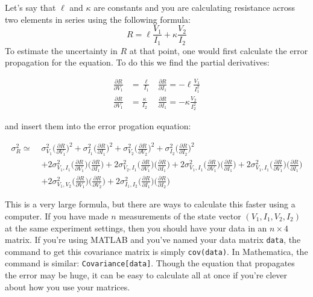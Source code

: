 \begin{example}
Let's say that $\ell$ and $\kappa$ are constants and you are calculating resistance across two elements in series using the following formula:
\begin{equation}
R = \ell \frac{V_1}{I_1} + \kappa \frac{V_2}{I_2}
\end{equation}
To estimate the uncertainty in $R$ at that point, one would first calculate the error propagation for the equation. To do this we find the partial derivatives:

\begin{align*}
	\frac{\partial R}{\partial V_1} &= \frac{\ell}{I_1} 		&	\frac{\partial R}{\partial I_1} = -\ell \frac{V_1}{I_1^2} 	\\
  	\frac{\partial R}{\partial V_1} &= \frac{\kappa}{I_2}  	&	\frac{\partial R}{\partial I_1} = -\kappa \frac{V_2}{I_2^2}
\end{align*}

and insert them into the error progation equation:

\begin{align*}
\sigma_R^2 \simeq   \; & \sigma_{V_1}^2 \bigg ( \frac{\partial R}{\partial V_1}\bigg )^2 + \sigma_{I_1}^2 \bigg ( \frac{\partial R}{\partial I_1}\bigg )^2  + \sigma_{V_2}^2 \bigg ( \frac{\partial R}{\partial V_2}\bigg )^2 + \sigma_{I_2}^2 \bigg ( \frac{\partial R}{\partial I_2}\bigg )^2   \\ &+ 2\sigma_{V_1,I_1}^2\bigg ( \frac{\partial R}{\partial V_1}\bigg )  \bigg ( \frac{\partial R}{\partial I_1}\bigg )  + 2\sigma_{V_2,I_1}^2\bigg ( \frac{\partial R}{\partial V_1}\bigg )  \bigg ( \frac{\partial R}{\partial I_1}\bigg ) + 2\sigma_{V_1,I_1}^2\bigg ( \frac{\partial R}{\partial V_1}\bigg )  \bigg ( \frac{\partial R}{\partial I_1}\bigg ) + 2\sigma_{V_1,I_1}^2\bigg ( \frac{\partial R}{\partial V_1}\bigg )  \bigg ( \frac{\partial R}{\partial I_1}\bigg ) \\ &  + 2\sigma_{V_1,V_2}^2\bigg ( \frac{\partial R}{\partial V_1}\bigg )  \bigg ( \frac{\partial R}{\partial V_2}\bigg )  + 2\sigma_{I_1,I_2}^2\bigg ( \frac{\partial R}{\partial I_1}\bigg )  \bigg ( \frac{\partial R}{\partial I_2}\bigg )
\end{align*}

This is a very large formula, but there are ways to calculate this faster using a computer.
If you have made $n$ measurements of the state vector $(V_1, I_1, V_2, I_2)$ at the same experiment settings, then you should have your data in an $n \times 4$ matrix. If you're using MATLAB and you've named your data matrix \texttt{data}, the command to get this covariance matrix is simply \texttt{cov(data)}. In Mathematica, the command is similar: \texttt{Covariance[data]}. Though the equation that propagates the error may be huge, it can be easy to calculate all at once if you're clever about how you use your matrices.

\end{example}


